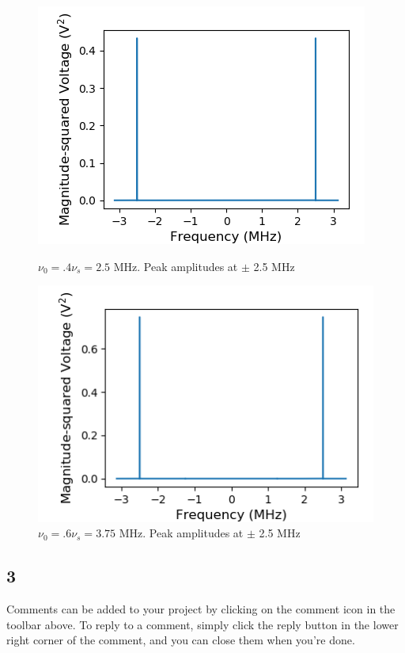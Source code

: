 \documentclass[a4paper]{article}
\begin{document}
\begin{figure}
\centering
\begin{minipage}{.5\textwidth}
	\centering
	\includegraphics[width=.8\linewidth]{5-2/pow4}
	\caption{$\nu_0 = .4 \nu_s = 2.5$ MHz. Peak amplitudes at $\pm$ 2.5 MHz}
	\label{fig:NyPw4}
\end{minipage}%
\begin{minipage}{.5\textwidth}
	\centering
	\includegraphics[width=.8\linewidth]{5-2/pow6}
	\caption{$\nu_0 = .6 \nu_s = 3.75$ MHz. Peak amplitudes at $\pm$ 2.5 MHz}
	\label{fig:NyPw6}
\end{minipage}
\end{figure}

\subsection{3}

Comments can be added to your project by clicking on the comment icon in the toolbar above. %
%
%
To reply to a comment, simply click the reply button in the lower right corner of the comment, and you can close them when you're done.
\end{document}
